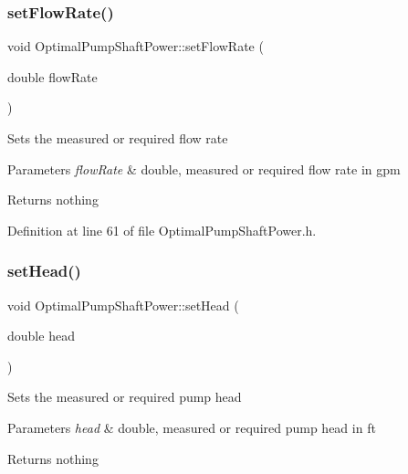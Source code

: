\subsubsection{\texorpdfstring{set\+Flow\+Rate()}{setFlowRate()}\hspace{0.1cm}{\footnotesize\ttfamily [3/3]}}
{\footnotesize\ttfamily void Optimal\+Pump\+Shaft\+Power\+::set\+Flow\+Rate (\begin{DoxyParamCaption}\item[{double}]{flow\+Rate }\end{DoxyParamCaption})\hspace{0.3cm}{\ttfamily [inline]}}

Sets the measured or required flow rate


\begin{DoxyParams}{Parameters}
{\em flow\+Rate} & double, measured or required flow rate in gpm\\
\hline
\end{DoxyParams}
\begin{DoxyReturn}{Returns}
nothing 
\end{DoxyReturn}


Definition at line 61 of file Optimal\+Pump\+Shaft\+Power.\+h.

\mbox{\label{class_optimal_pump_shaft_power_aa080c62ff92fc70a4e27e7710e490b62}} 
\subsubsection{\texorpdfstring{set\+Head()}{setHead()}\hspace{0.1cm}{\footnotesize\ttfamily [1/3]}}
{\footnotesize\ttfamily void Optimal\+Pump\+Shaft\+Power\+::set\+Head (\begin{DoxyParamCaption}\item[{double}]{head }\end{DoxyParamCaption})\hspace{0.3cm}{\ttfamily [inline]}}

Sets the measured or required pump head


\begin{DoxyParams}{Parameters}
{\em head} & double, measured or required pump head in ft\\
\hline
\end{DoxyParams}
\begin{DoxyReturn}{Returns}
nothing 
\end{DoxyReturn}


